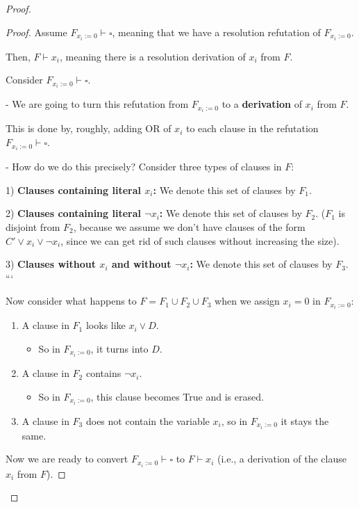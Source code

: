 \begin{proof}
\begin{proof}
Assume $F_{x_i := 0} \vdash \square$, meaning that we have a resolution refutation of $F_{x_i := 0}$.

Then, $F \vdash x_i$, meaning there is a resolution derivation of $x_i$ from $F$.
  

Consider $F_{x_i := 0} \vdash \square$.

- We are going to turn this refutation from $F_{x_i := 0}$ to a \textbf{derivation} of $x_i$ from $F$.

  This is done by, roughly, adding OR of $x_i$ to each clause in the refutation $F_{x_i := 0} \vdash \square$.

- How do we do this precisely?  
  Consider three types of clauses in $F$:

  1) \textbf{Clauses containing literal $x_i$:}  
     We denote this set of clauses by $F_1$.

  2) \textbf{Clauses containing literal $\neg x_i$:}  
     We denote this set of clauses by $F_2$.  
     ($F_1$ is disjoint from $F_2$, because we assume we don’t have clauses of the form $C' \lor x_i \lor \neg x_i$, since we can get rid of such clauses without increasing the size).

  3) \textbf{Clauses without $x_i$ and without $\neg x_i$:}  
     We denote this set of clauses by $F_3$.
```
 

Now consider what happens to $F = F_1 \cup F_2 \cup F_3$ when we assign $x_i = 0$ in $F_{x_i := 0}$:

\begin{enumerate}
    \item A clause in $F_1$ looks like $x_i \lor D$.
    \begin{itemize}
        \item So in $F_{x_i := 0}$, it turns into $D$.
    \end{itemize}

    \item A clause in $F_2$ contains $\neg x_i$.
    \begin{itemize}
        \item So in $F_{x_i := 0}$, this clause becomes True and is erased.
    \end{itemize}

    \item A clause in $F_3$ does not contain the variable $x_i$, so in $F_{x_i := 0}$ it stays the same.
\end{enumerate}

Now we are ready to convert $F_{x_i := 0} \vdash \square$ to $F \vdash x_i$ (i.e., a derivation of the clause $x_i$ from $F$).


\end{proof}
\end{proof}
